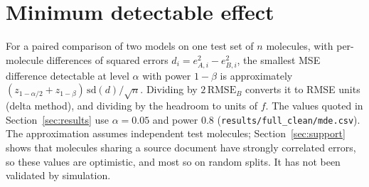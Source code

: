 \section{Minimum detectable effect}\label{app:mde}
For a paired comparison of two models on one test set of $n$ molecules, with per-molecule differences of squared errors $d_i=e_{A,i}^2-e_{B,i}^2$, the smallest MSE difference detectable at level $\alpha$ with power $1-\beta$ is approximately $(z_{1-\alpha/2}+z_{1-\beta})\,\mathrm{sd}(d)/\sqrt{n}$. Dividing by $2\,\mathrm{RMSE}_B$ converts it to RMSE units (delta method), and dividing by the headroom to units of $f$. The values quoted in Section~\ref{sec:results} use $\alpha=0.05$ and power 0.8 (\texttt{results/}\allowbreak\texttt{full\_clean/mde.csv}). The approximation assumes independent test molecules; Section~\ref{sec:support} shows that molecules sharing a source document have strongly correlated errors, so these values are optimistic, and most so on random splits. It has not been validated by simulation.
